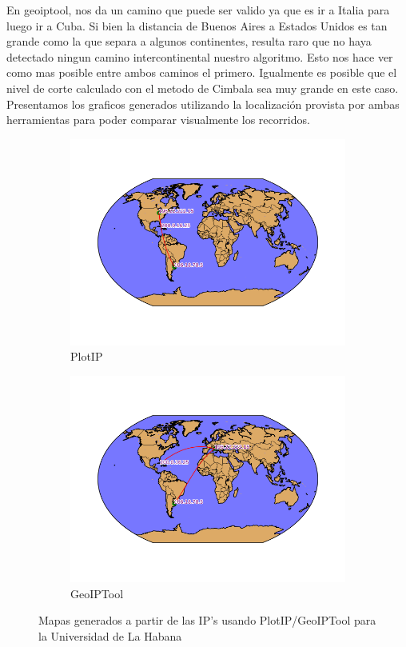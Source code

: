 En geoiptool, nos da un camino que puede ser valido ya que es ir a Italia para
luego ir a Cuba. Si bien la distancia de Buenos Aires a Estados Unidos es tan
grande como la que separa a algunos continentes, resulta raro que no haya
detectado ningun camino intercontinental nuestro algoritmo. Esto nos hace ver
como mas posible entre ambos caminos el primero. Igualmente es posible que el
nivel de corte calculado con el metodo de Cimbala sea muy grande en este
caso.\\

Presentamos los graficos generados utilizando la localizaci\'on provista por
ambas herramientas para poder comparar visualmente los recorridos.

\begin{figure}[ht]
	\begin{subfigure}[b]{0.5\textwidth}
		\centering
		\includegraphics[width=\linewidth]{imagenes/mapa_habana_plotip.png}
		\caption{PlotIP}
	\end{subfigure} 
	\begin{subfigure}[b]{0.5\textwidth}
		\centering
		\includegraphics[width=\linewidth]{imagenes/mapa_habana_geoip.png}
		\caption{GeoIPTool}
	\end{subfigure} 
	\caption{Mapas generados a partir de las IP's usando PlotIP/GeoIPTool para la Universidad de La Habana}
\end{figure}

